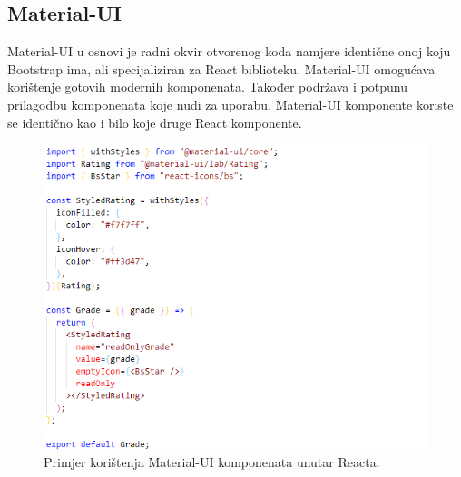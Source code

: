 \documentclass[times, utf8, zavrsni]{fer}
\begin{document}
			\subsection{Material-UI}
			Material-UI u osnovi je radni okvir otvorenog koda namjere identične onoj koju Bootstrap ima, ali specijaliziran za React biblioteku. Material-UI omogućava korištenje gotovih modernih komponenata. Također podržava i potpunu prilagodbu komponenata koje nudi za uporabu. Material-UI komponente koriste se identično kao i bilo koje druge React komponente.
			\begin{figure}[H]
				\centering
				\includegraphics[scale=0.75]{pictures/prikazi/MaterialUI.png}
				\caption{Primjer korištenja Material-UI komponenata unutar Reacta.}
				\label{fig:materialUI}
			\end{figure}
			
\end{document}
